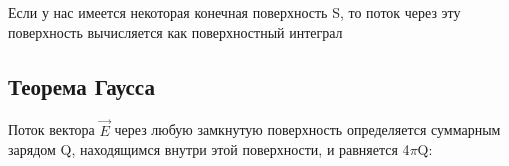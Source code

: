 Если у нас имеется некоторая конечная поверхность S, то поток
через эту поверхность вычисляется как поверхностный интеграл


\subsection*{Теорема Гаусса}

Поток вектора $\vec{E}$ через любую замкнутую
поверхность определяется суммарным зарядом Q, находящимся внутри этой
поверхности, и равняется 4$\pi$Q:




